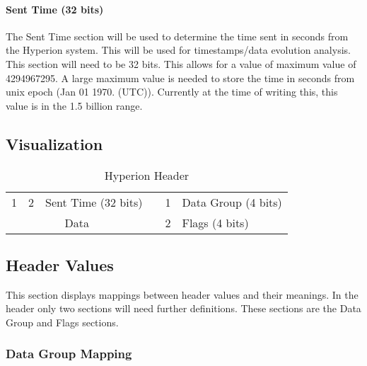 \documentclass{article}
\begin{document}
  \paragraph{Sent Time (32 bits)}
  The Sent Time section will be used to determine the time sent in seconds from the Hyperion system. This will be used for timestamps/data evolution analysis. This section will need to be 32 bits. This allows for a value of maximum value of 4294967295. A large maximum value is needed to store the time in seconds from unix epoch (Jan 01 1970. (UTC)). Currently at the time of writing this, this value is in the 1.5 billion range. 
  
  \subsection{Visualization}
  
  \begin{table}[h]
  \centering
  \caption{Hyperion Header}
  \label{Hyperion Header}
  \begin{tabular}{|c|c|c|l|l|l|l|l|l|l|lll}
  \cline{1-10}
  1 & 2 & \multicolumn{8}{c|}{Sent Time (32 bits)} &  & 1 & Data Group (4 bits) \\ \cline{1-10}
  \multicolumn{10}{|c|}{Data}                      &  & 2 & Flags (4 bits)      \\ \cline{1-10}
  \end{tabular}
  \end{table}
  
  \subsection{Header Values}
  This section displays mappings between header values and their meanings. In the header only two sections will need further definitions. These sections are the Data Group and Flags sections.
  
  \subsubsection{Data Group Mapping}
  
\end{document}
